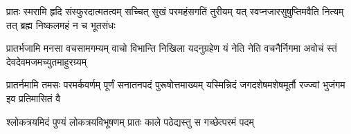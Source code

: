 
\fourlineindentedshloka
{प्रातः स्मरामि हृदि संस्फुरदात्मतत्वम्}
{सच्चित् सुखं परमहंसगतिं तुरीयम्}
{यत् स्वप्नजारसुषुप्तिमवैति नित्यम्}
{तत् ब्रह्म निष्कलमहं न च भूतसंधः}
        
\fourlineindentedshloka
{प्रातर्भजामि मनसा वचसामगम्यम्}
{वाचो विभान्ति निखिला यदनुग्रहेण}
{यं नेति नेति वचनैर्निगमा अवोचं}
{स्तं देवदेवमजमच्युतमाहुरग्र्यम्}
            
\fourlineindentedshloka
{प्रातर्नमामि तमसः परमर्कवर्णम्}
{पूर्णं सनातनपदं पुरूषोत्तमाख्यम्}
{यस्मिन्निदं जगदशेषमशेषमूर्तौ}
{रज्ज्वां भुजंगम इव प्रतिमासितं वै}
            
\twolineshloka
{श्लोकत्रयमिदं पुण्यं लोकत्रयविभूषणम्}
{प्रातः काले पठेद्यस्तु स गच्छेत्परमं पदम्}
            
            
\closesection
